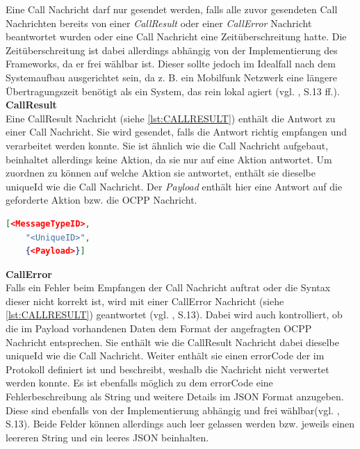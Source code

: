 \noindent Eine Call Nachricht darf nur gesendet werden, falls alle zuvor gesendeten Call Nachrichten bereits von einer \textit{CallResult} oder einer \textit{CallError} Nachricht beantwortet wurden oder eine Call Nachricht eine Zeitüberschreitung hatte. Die Zeitüberschreitung ist dabei allerdings abhängig von der Implementierung des Frameworks, da er frei wählbar ist. Dieser sollte jedoch im Idealfall nach dem Systemaufbau ausgerichtet sein, da z. B. ein Mobilfunk Netzwerk eine längere Übertragungszeit benötigt als ein System, das rein lokal agiert (vgl. \cite{OCPP-2.0.1-part4-ocpp-j-specification}, S.13 ff.).\\

\noindent\textbf{CallResult}\\
\noindent Eine CallResult Nachricht (siehe \autoref{lst:CALLRESULT}) enthält die Antwort zu einer Call Nachricht. Sie wird gesendet, falls die Antwort richtig empfangen und verarbeitet werden konnte. Sie ist ähnlich wie die Call Nachricht aufgebaut, beinhaltet allerdings keine Aktion, da sie nur auf eine Aktion antwortet.
Um zuordnen zu können auf welche Aktion sie antwortet, enthält sie dieselbe uniqueId wie die Call Nachricht. Der \textit{Payload} enthält hier eine Antwort auf die geforderte Aktion bzw. die \acs{OCPP} Nachricht.\\

\begin{lstlisting}[language=json, caption={CallResult Nachrichten Aufbau \cite{Eigene_Darstellung, OCPP-1.6-edition-2}}, label=lst:CALLRESULT, float]
	[<MessageTypeID>,
	"<UniqueID>",
	{<Payload>}]
\end{lstlisting}

\noindent\textbf{CallError}\\
\noindent Falls ein Fehler beim Empfangen der Call Nachricht auftrat oder die Syntax dieser nicht korrekt ist, wird mit einer CallError Nachricht (siehe \autoref{lst:CALLRESULT}) geantwortet (vgl. \cite{OCPP-j-1.6-specification}, S.13). Dabei wird auch kontrolliert, ob die im Payload vorhandenen Daten dem Format der angefragten \acs{OCPP} Nachricht entsprechen. Sie enthält wie die CallResult Nachricht dabei dieselbe uniqueId wie die Call Nachricht. Weiter enthält sie einen errorCode der im Protokoll definiert ist und beschreibt, weshalb die Nachricht nicht verwertet werden konnte. Es ist ebenfalls möglich zu dem errorCode eine Fehlerbeschreibung als String und weitere Details im \acs{JSON} Format anzugeben. Diese sind ebenfalls von der Implementierung abhängig und frei wählbar(vgl. \cite{OCPP-j-1.6-specification}, S.13). Beide Felder können allerdings auch leer gelassen werden bzw. jeweils einen leereren String und ein leeres \acs{JSON} beinhalten.


